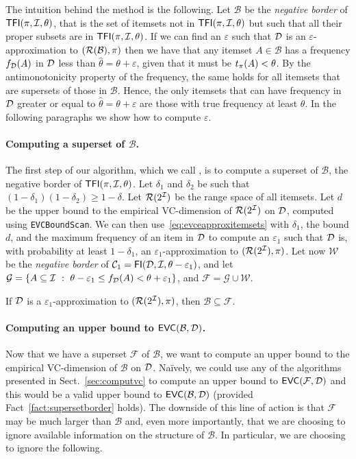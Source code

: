 The intuition behind the method is the following. Let $\mathcal{B}$ be the
\emph{negative border} of $\mathsf{TFI}(\pi,{\cal I},\theta)$, that is the set of itemsets
not in $\mathsf{TFI}(\pi,{\cal I},\theta)$ but such that all their proper subsets are in
$\mathsf{TFI}(\pi,{\cal I},\theta)$. If we can find an $\varepsilon$ such that ${\cal D}$ is an
$\varepsilon$-approximation to $(\mathcal{R}(\mathcal{B}),\pi)$ then we have that any
itemset $A\in\mathcal{B}$ has a frequency $f_{\cal D}(A)$ in ${\cal D}$ less than
$\hat{\theta}=\theta+\varepsilon$, given that it must be $t_\pi(A)<\theta$. By
the antimonotonicity property of the frequency, the same holds for all itemsets
that are supersets of those in $\mathcal{B}$. Hence, the only itemsets that can
have frequency in ${\cal D}$ greater or equal to $\hat{\theta}=\theta+\varepsilon$
are those with true frequency at least $\theta$. In the following paragraphs we
show how to compute $\varepsilon$.

\paragraph{Computing a superset of $\mathcal{B}$.} The first step of our
algorithm, which we call \ALG{}, is to compute a superset of $\mathcal{B}$, the
negative border of $\mathsf{TFI}(\pi,{\cal I},\theta)$. Let $\delta_1$ and $\delta_2$ be
such that $(1-\delta_1)(1-\delta_2)\ge 1-\delta$. Let $\mathcal{R}(2^{\cal I})$ be the
range space of all itemsets. Let $d$ be the upper bound to the empirical
VC-dimension of $\mathcal{R}(2^{\cal I})$ on ${\cal D}$, computed using
\texttt{EVCBoundScan}. We can then use~\eqref{eq:evceapproxitemsets} with
$\delta_1$, the bound $d$, and the maximum frequency of an item in ${\cal D}$ to
compute an $\varepsilon_1$ such that ${\cal D}$ is, with probability at least
$1-\delta_1$, an $\varepsilon_1$-approximation to $(\mathcal{R}(2^{\cal I}),\pi)$. Let
now $\mathcal{W}$ be the \emph{negative border} of
$\mathcal{C}_1=\mathsf{FI}({\cal D},{\cal I},\theta-\varepsilon_1)$, and let
$\mathcal{G}=\{A\subseteq{\cal I} ~:~ \theta-\varepsilon_1\le
f_{\cal D}(A)<\theta+\varepsilon_1\}$, and $\mathcal{F}=\mathcal{G}\cup\mathcal{W}$.

\begin{fact}\label{fact:supersetborder}
	If ${\cal D}$ is a $\varepsilon_1$-approximation to $(\mathcal{R}(2^{\cal I}),\pi)$,
	then $\mathcal{B}\subseteq\mathcal{F}$.
\end{fact}

\paragraph{Computing an upper bound to $\mathsf{EVC}(\mathcal{B},{\cal D})$.} Now that we
have a superset $\mathcal{F}$ of $\mathcal{B}$, we want to compute an upper
bound to the empirical VC-dimension of $\mathcal{B}$ on ${\cal D}$. Na\"ively, we
could use any of the algorithms presented in Sect.~\ref{sec:computvc} to compute
an upper bound to $\mathsf{EVC}(\mathcal{F},{\cal D})$ and this would be a valid upper bound
to $\mathsf{EVC}(\mathcal{B},{\cal D})$ (provided Fact~\ref{fact:supersetborder} holds). The
downside of this line of action is that $\mathcal{F}$ may be much larger than
$\mathcal{B}$ and, even more importantly, that we are choosing to ignore
available information on the structure of $\mathcal{B}$. In particular, we are
choosing to ignore the following.

